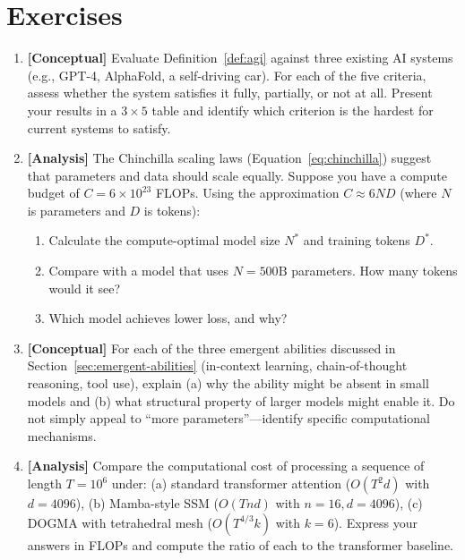 \section{Exercises}
\label{sec:ch16-exercises}

\begin{enumerate}[label=\textbf{16.\arabic*.}, leftmargin=2.5em]

\item \textbf{[Conceptual]} Evaluate Definition~\ref{def:agi} against three existing AI systems (e.g., GPT-4, AlphaFold, a self-driving car). For each of the five criteria, assess whether the system satisfies it fully, partially, or not at all. Present your results in a $3 \times 5$ table and identify which criterion is the hardest for current systems to satisfy.

\item \textbf{[Analysis]} The Chinchilla scaling laws (Equation~\ref{eq:chinchilla}) suggest that parameters and data should scale equally. Suppose you have a compute budget of $C = 6 \times 10^{23}$ FLOPs. Using the approximation $C \approx 6ND$ (where $N$ is parameters and $D$ is tokens):
\begin{enumerate}[label=(\alph*)]
  \item Calculate the compute-optimal model size $N^*$ and training tokens $D^*$.
  \item Compare with a model that uses $N = 500\text{B}$ parameters. How many tokens would it see?
  \item Which model achieves lower loss, and why?
\end{enumerate}

\item \textbf{[Conceptual]} For each of the three emergent abilities discussed in Section~\ref{sec:emergent-abilities} (in-context learning, chain-of-thought reasoning, tool use), explain (a) why the ability might be absent in small models and (b) what structural property of larger models might enable it. Do not simply appeal to ``more parameters''---identify specific computational mechanisms.

\item \textbf{[Analysis]} Compare the computational cost of processing a sequence of length $T = 10^6$ under: (a) standard transformer attention ($O(T^2 d)$ with $d = 4096$), (b) Mamba-style SSM ($O(T n d)$ with $n = 16, d = 4096$), (c) DOGMA with tetrahedral mesh ($O(T^{4/3} k)$ with $k = 6$). Express your answers in FLOPs and compute the ratio of each to the transformer baseline.


\end{enumerate}

